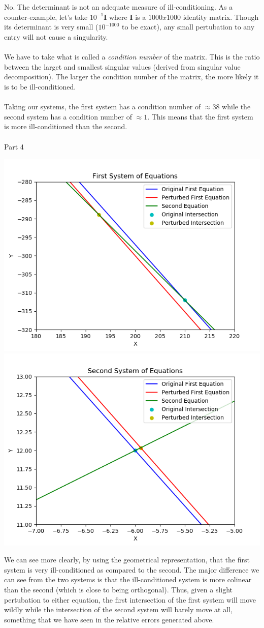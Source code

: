 \documentclass[10pt]{article} %
\begin{document}
\\ \\
\normalsize{No. The determinant is not an adequate measure of ill-conditioning. As a counter-example, let's take $10^{-1}\boldsymbol{I}$ where $\boldsymbol{I}$ is a $1000x1000$ identity matrix. Though its determinant is very small ($10^{-1000}$ to be exact), any small pertubation to any entry will not cause a singularity.}
\\ \\
We have to take what is called a \textit{condition number} of the matrix. This is the ratio between the larget and smallest singular values (derived from singular value decomposition). The larger the condition number of the matrix, the more likely it is to be ill-conditioned.
\\ \\
Taking our systems, the first system has a condition number of $\approx 38$ while the second system has a condition number of $\approx 1$. This means that the first system is more ill-conditioned than the second.
\\ \\
\noindent \large{Part 4}
\begin{center}
\includegraphics[width=.4\textwidth]{../figs/q2_first.png}
\includegraphics[width=.4\textwidth]{../figs/q2_second.png}
\end{center}
\normalsize{We can see more clearly, by using the geometrical representation, that the first system is very ill-conditioned as compared to the second. The major difference we can see from the two systems is that the ill-conditioned system is more colinear than the second (which is close to being orthogonal). Thus, given a slight pertubation to either equation, the first intersection of the first system will move wildly while the intersection of the second system will barely move at all, something  that we have seen in the relative errors generated above.}
\end{document}
